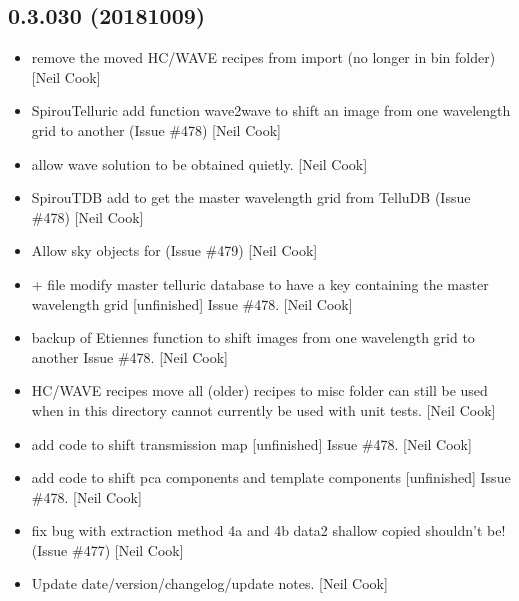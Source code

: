 \documentclass[a4paper,10pt,english]{report}
\begin{document}
\subsection{0.3.030 (2018\sphinxhyphen{}10\sphinxhyphen{}09)}
\label{\detokenize{misc/changelog:id320}}\begin{itemize}
\item {} 
 \sphinxhyphen{} remove the moved HC/WAVE recipes from import
(no longer in bin folder) {[}Neil Cook{]}

\item {} 
SpirouTelluric \sphinxhyphen{} add function wave2wave to shift an image from one
wavelength grid to another (Issue \#478) {[}Neil Cook{]}

\item {} 
 \sphinxhyphen{} allow wave solution to be obtained quietly. {[}Neil
Cook{]}

\item {} 
SpirouTDB \sphinxhyphen{} add  to get the master wavelength
grid from TelluDB (Issue \#478) {[}Neil Cook{]}

\item {} 
 \sphinxhyphen{} Allow sky objects for  (Issue
\#479) {[}Neil Cook{]}

\item {} 
 + file \sphinxhyphen{} modify master telluric database to
have a  key \sphinxhyphen{} containing the master wavelength grid
{[}unfinished{]} \sphinxhyphen{} Issue \#478. {[}Neil Cook{]}

\item {} 
 \sphinxhyphen{} backup of Etiennes function to shift images from one
wavelength grid to another \sphinxhyphen{} Issue \#478. {[}Neil Cook{]}

\item {} 
HC/WAVE recipes \sphinxhyphen{} move all (older) recipes to misc folder \sphinxhyphen{} can still
be used when in this directory \sphinxhyphen{} cannot currently be used with unit
tests. {[}Neil Cook{]}

\item {} 
 \sphinxhyphen{} add code to shift transmission map {[}unfinished{]} \sphinxhyphen{}
Issue \#478. {[}Neil Cook{]}

\item {} 
 \sphinxhyphen{} add code to shift pca components and template
components {[}unfinished{]} \sphinxhyphen{} Issue \#478. {[}Neil Cook{]}

\item {} 
 \sphinxhyphen{} fix bug with extraction method 4a and 4b \sphinxhyphen{}
data2 shallow copied \sphinxhyphen{} shouldn’t be! (Issue \#477) {[}Neil Cook{]}

\item {} 
Update date/version/changelog/update notes. {[}Neil Cook{]}

\end{itemize}
\end{document}
